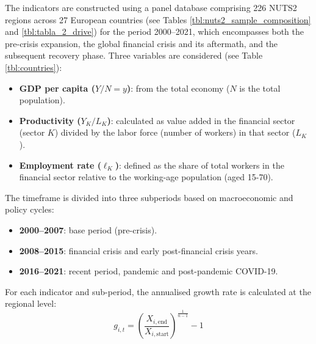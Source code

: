 \documentclass[a4paper,11pt,oneside]{article}
\begin{document}
The indicators are constructed using a panel database comprising 226 NUTS2 regions across 27 European countries (see Tables \ref{tbl:nuts2_sample_composition} and \ref{tbl:tabla_2_drive}) for the period 2000--2021, which encompasses both the pre-crisis expansion, the global financial crisis and its aftermath, and the subsequent recovery phase. Three variables are considered (see Table \ref{tbl:countries}):



\begin{itemize}
  \item \textbf{GDP per capita ($Y/N=y$)}: from the total economy ($N$ is the total population). 
  \item \textbf{Productivity ($Y_K/L_K$)}: calculated as value added in the 
        financial sector (sector $K$) divided by the labor force (number of workers) in 
        that sector ($L_K$).
  \item \textbf{Employment rate ($\ell_K$)}: defined as the share of total workers in the financial sector relative to the working-age 
        population (aged 15-70).
\end{itemize}

The timeframe is divided into three subperiods based on macroeconomic and policy cycles:

\begin{itemize}
  \item \textbf{2000--2007}: base period (pre-crisis).
  \item \textbf{2008--2015}: financial crisis and early post-financial crisis years.
  \item \textbf{2016--2021}: recent period, pandemic and post-pandemic COVID-19.
\end{itemize}



\color{black}



For each indicator and sub-period, the annualised growth rate is calculated at the regional level:
%
\begin{equation}
\label{eq:primera}
g_{i,t} = \left( \frac{X_{i,\text{end}}}{X_{i,\text{start}}} \right)^{\frac{1}{n - 1}} - 1
\end{equation}
\end{document}

